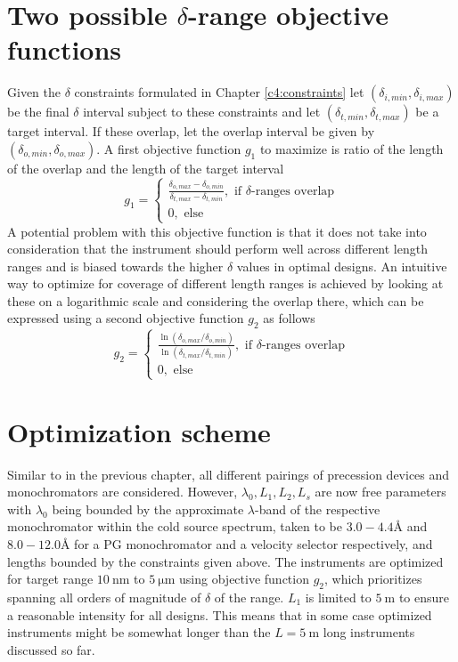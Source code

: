 \section{Two possible $\delta$-range objective functions}
\label{c5.2}
Given the $\delta$ constraints formulated in Chapter \ref{c4:constraints} let $(\delta_{i, min},\delta_{i, max})$ be the final $\delta$ interval subject to these constraints and let $(\delta_{t, min},\delta_{t, max})$ be a target interval. If these overlap, let the overlap interval be given by $(\delta_{o, min},\delta_{o, max})$. A first objective function $g_1$ to maximize is ratio of the length of the overlap and the length of the target interval
$$g_1 = \begin{cases}
	\frac{\delta_{o, max}-\delta_{o, min}}{\delta_{t, max} - \delta_{t, min}},\text{ if $\delta$-ranges overlap}\\
	0,\text{ else}
\end{cases}$$
A potential problem with this objective function is that it does not take into consideration that the instrument should perform well across different length ranges and is biased towards the higher $\delta$ values in optimal designs. An intuitive way to optimize for coverage of different length ranges is achieved by looking at these on a logarithmic scale and considering the overlap there, which can be expressed using a second objective function $g_2$ as follows 
$$g_2 = \begin{cases}
	\frac{\ln(\delta_{o, max}/\delta_{o, min})}{\ln(\delta_{t, max}/\delta_{t, min})},\text{ if $\delta$-ranges overlap}\\
	0,\text{ else}
\end{cases}$$

\section{Optimization scheme}
\label{c5.3}
Similar to in the previous chapter, all different pairings of precession devices and monochromators are considered. However, $\lambda_0, L_1, L_2, L_s$ are now free parameters with $\lambda_0$ being bounded by the approximate $\lambda$-band of the respective monochromator within the cold source spectrum, taken to be $3.0 - 4.4$Å and $8.0 - 12.0$Å for a PG monochromator and a velocity selector respectively, and lengths bounded by the constraints given above. 
The instruments are optimized for target range $\SI{10}{\nano\meter}$ to $\SI{5}{\micro\meter}$ using objective function $g_2$, which prioritizes spanning all orders of magnitude of $\delta$ of the range. $L_1$ is limited to $\SI{5}{\meter}$ to ensure a reasonable intensity for all designs. This means that in some case optimized instruments might be somewhat longer than the $L = \SI{5}{\meter}$ long instruments discussed so far. 

